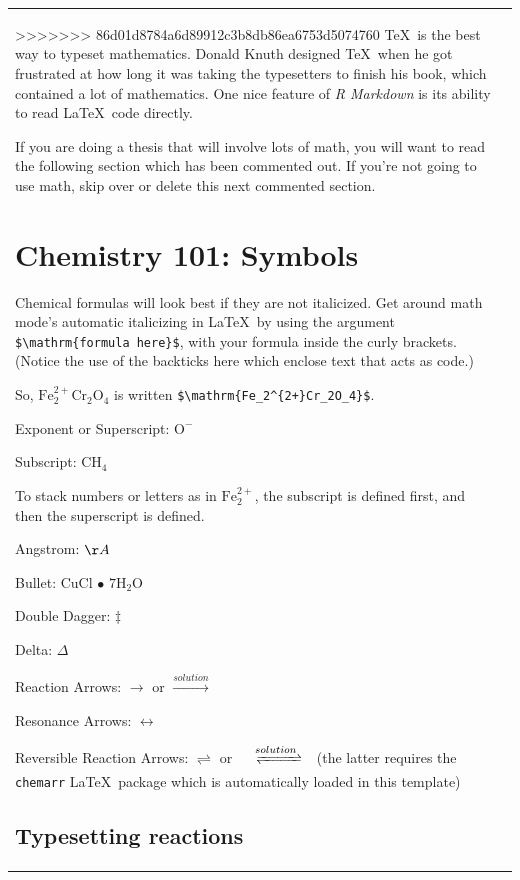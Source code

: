 \documentclass[12pt,twoside]{reedthesis}
\begin{document}
\begin{longtable}[c]{@{}lr@{}}
>>>>>>> 86d01d8784a6d89912c3b8db86ea6753d5074760
  \TeX~is the best way to typeset mathematics. Donald Knuth designed
  \TeX~when he got frustrated at how long it was taking the typesetters to
  finish his book, which contained a lot of mathematics. One nice feature
  of \emph{R Markdown} is its ability to read \LaTeX~code directly.
  
  If you are doing a thesis that will involve lots of math, you will want
  to read the following section which has been commented out. If you're
  not going to use math, skip over or delete this next commented section.
  
  \section{Chemistry 101: Symbols}\label{chemistry-101-symbols}
  
  Chemical formulas will look best if they are not italicized. Get around
  math mode's automatic italicizing in \LaTeX~by using the argument
  \texttt{\$\textbackslash{}mathrm\{formula\ here\}\$}, with your formula
  inside the curly brackets. (Notice the use of the backticks here which
  enclose text that acts as code.)
  
  So, \(\mathrm{Fe_2^{2+}Cr_2O_4}\) is written
  \texttt{\$\textbackslash{}mathrm\{Fe\_2\^{}\{2+\}Cr\_2O\_4\}\$}.
  
  \noindent Exponent or Superscript: \(\mathrm{O^-}\)
  
  \noindent Subscript: \(\mathrm{CH_4}\)
  
  To stack numbers or letters as in \(\mathrm{Fe_2^{2+}}\), the subscript
  is defined first, and then the superscript is defined.
  
  \noindent Angstrom: \({\AA}\)
  
  \noindent Bullet: CuCl \(\bullet\) \(\mathrm{7H_{2}O}\)
  
  \noindent Double Dagger: \(\ddag\)
  
  \noindent Delta: \(\Delta\)
  
  \noindent Reaction Arrows: \(\longrightarrow\) or
  \(\xrightarrow{solution}\)
  
  \noindent Resonance Arrows: \(\leftrightarrow\)
  
  \noindent Reversible Reaction Arrows: \(\rightleftharpoons\) or
  \(\xrightleftharpoons[ ]{solution}\) (the latter requires the
  \texttt{chemarr} \LaTeX~package which is automatically loaded in this
  template)
  
  \subsection{Typesetting reactions}\label{typesetting-reactions}
  

\end{longtable}
\end{document}
